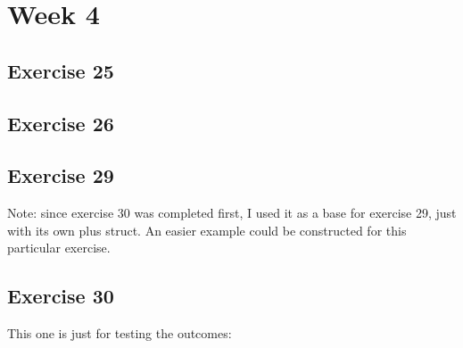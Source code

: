 



\section*{Week 4}
\subsection*{Exercise 25}

\newpage
\subsection*{Exercise 26}

\newpage
\subsection*{Exercise 29}
Note: since exercise 30 was completed first, I used it as a base for exercise 29, just with its own plus struct. An easier example could be constructed for this particular exercise.

\newpage
\subsection*{Exercise 30}
This one is just for testing the outcomes:


